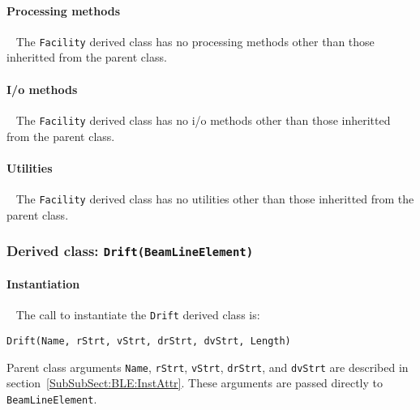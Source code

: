 \paragraph{Processing methods} ~\newline
\noindent
The \texttt{Facility} derived class has no processing methods other
than those inheritted from the parent class.

\paragraph{I/o methods} ~\newline
\noindent
The \texttt{Facility} derived class has no i/o methods other than
those inheritted from the parent class.

\paragraph{Utilities} ~\newline
\noindent
The \texttt{Facility} derived class has no utilities other than those
inheritted from the parent class. 

\FloatBarrier

\subsubsection{Derived class: \texttt{Drift(BeamLineElement)}}

\paragraph{Instantiation} ~\newline
\noindent
The call to instantiate the \texttt{Drift} derived class is:
\begin{center}
  \texttt{Drift(Name, rStrt, vStrt, drStrt, dvStrt, Length)}
\end{center}
Parent class arguments \texttt{Name}, \texttt{rStrt}, \texttt{vStrt},
\texttt{drStrt}, and \texttt{dvStrt} are described in
section~\ref{SubSubSect:BLE:InstAttr}.
These arguments are passed directly to \texttt{BeamLineElement}.


